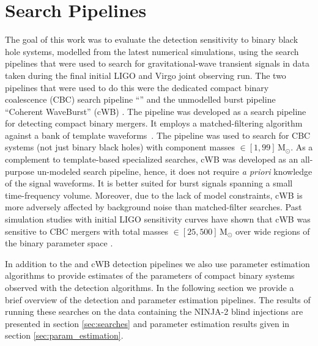 \section{Search Pipelines}
\label{sec:pipelines}

The goal of this work was to evaluate the detection sensitivity to
binary black hole systems, modelled from the latest numerical
simulations, using the search pipelines that were used to search for
gravitational-wave transient signals in data taken during the final
initial LIGO and Virgo joint observing run.  The two pipelines that
were used to do this were the dedicated compact binary coalescence
(CBC) search pipeline ``\ihope{}'' \cite{Abbott:2009tt, Abbott:2009qj,
Abadie:2011kd, Colaboration:2011np, Aasi:2012rja, Babak:2012zx}
and the unmodelled burst pipeline ``Coherent WaveBurst'' (cWB)
\cite{Abbott:2007wu, Abadie:2010mt, Abadie:2012rq, Virgo:2012aa}. The
\ihope{} pipeline was developed as a search pipeline for detecting
compact binary mergers. It employs a matched-filtering algorithm
against a bank of template waveforms~\cite{Babak:2012zx}. The \ihope{}
pipeline was used to search for CBC systems (not just binary black
holes) with component masses $\in [1,99]\, \mathrm{M}_{\odot}$.  As a
complement to template-based specialized searches, cWB was developed
as an all-purpose un-modeled search pipeline, hence, it does not
require \emph{a priori} knowledge of the signal waveforms. It is
better suited for burst signals spanning a small time-frequency
volume. Moreover, due to the lack of model constraints, cWB is more
adversely affected by background noise than matched-filter searches.
Past simulation studies with initial LIGO sensitivity curves have
shown that cWB was sensitive to CBC mergers with total masses $\in
[25,500]\, \mathrm{M}_{\odot}$ over wide regions of the binary
parameter space \cite{Pankow:2009nx}.

In addition to the \ihope{} and cWB detection pipelines we also use parameter 
estimation algorithms to provide estimates of the parameters of compact binary 
systems observed with the detection algorithms. 
In the following section we provide a brief overview of the detection and 
parameter estimation pipelines.
The results of running these searches on the data containing the NINJA-2 blind
injections are presented in section \ref{sec:searches} and parameter estimation 
results given in section \ref{sec:param_estimation}.

